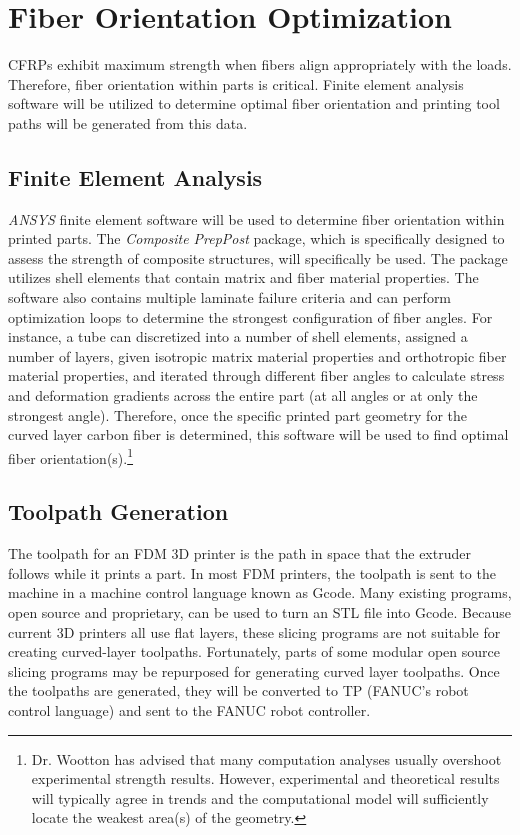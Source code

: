 \section{Fiber Orientation Optimization}

\indent

CFRPs exhibit maximum strength when fibers align appropriately with the loads. Therefore, fiber orientation within parts is critical. Finite element analysis software will be utilized to determine optimal fiber orientation and printing tool paths will be generated from this data.

\subsection{Finite Element Analysis}

\indent

\emph{ANSYS} finite element software will be used to determine fiber orientation within printed parts. The \emph{Composite PrepPost} package, which is specifically designed to assess the strength of composite structures, will specifically be used. The package utilizes shell elements that contain matrix and fiber material properties. The software also contains multiple laminate failure criteria and can perform optimization loops to determine the strongest configuration of fiber angles. For instance, a tube can discretized into a number of shell elements, assigned a number of layers, given isotropic matrix material properties and orthotropic fiber material properties, and iterated through different fiber angles to calculate stress and deformation gradients across the entire part (at all angles or at only the strongest angle). Therefore, once the specific printed part geometry for the curved layer carbon fiber is determined, this software will be used to find optimal fiber orientation(s).\footnote{Dr. Wootton has advised that many computation analyses usually overshoot experimental strength results. However, experimental and theoretical results will typically agree in trends and the computational model will sufficiently locate the weakest area(s) of the geometry.}\\


\subsection{Toolpath Generation}

\indent

The toolpath for an FDM 3D printer is the path in space that the extruder follows while it prints a part. In most FDM printers, the toolpath is sent to the machine in a machine control language known as Gcode. Many existing programs, open source and proprietary, can be used to turn an STL file into Gcode. Because current 3D printers all use flat layers, these slicing programs are not suitable for creating curved-layer toolpaths. Fortunately, parts of some modular open source slicing programs may be repurposed for generating curved layer toolpaths. Once the toolpaths are generated, they will be converted to TP (FANUC's robot control language) and sent to the FANUC robot controller. \\
